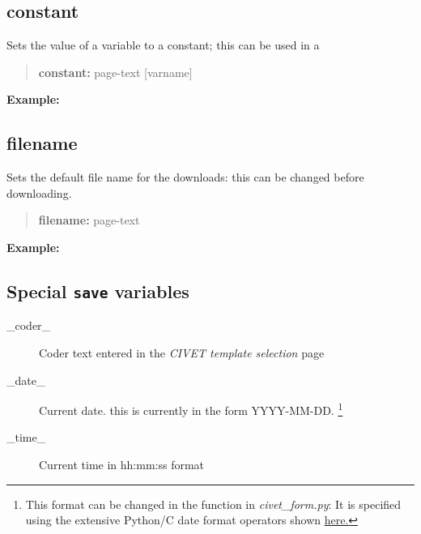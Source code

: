\documentclass[letterpaper,10pt,english]{sphinxmanual}
\begin{document}
\subsection{constant}
\label{forms:constant}
Sets the value of a variable to a constant; this can be used in a
\begin{quote}

\begin{DUlineblock}{0em}
\item[] \textbf{constant:} page-text {[}varname{]}
\end{DUlineblock}
\end{quote}

\textbf{Example:}
\begin{quote}

\end{quote}


\subsection{filename}
\label{forms:filename}
Sets the default file name for the downloads: this can be changed before
downloading.
\begin{quote}

\begin{DUlineblock}{0em}
\item[] \textbf{filename:} page-text
\end{DUlineblock}
\end{quote}

\textbf{Example:}
\begin{quote}

\end{quote}


\subsection{Special \texttt{save} variables}
\label{forms:special-save-variables}\begin{description}
\item[{\_coder\_}] \leavevmode
Coder text entered in the \emph{CIVET template selection} page

\item[{\_date\_}] \leavevmode
Current date. this is currently in the form YYYY-MM-DD. \footnote{
This format can be changed in the function  in
\emph{civet\_form.py}: It is specified using the extensive Python/C date format
operators shown \href{http://strftime.org/}{here.}
}

\item[{\_time\_}] \leavevmode
Current time in hh:mm:ss format

\end{description}
\end{document}
